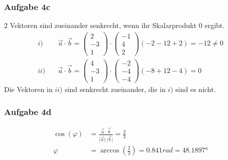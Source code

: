 \documentclass[a4paper,11pt]{article}
\begin{document}
  \subsubsection*{Aufgabe 4c}
    2 Vektoren sind zueinander senkrecht, wenn ihr Skalarprodukt 0 ergibt.
    \begin{align*}
      i) \quad&\vec{a}\cdot\vec{b}=\begin{pmatrix}2\\-3\\1\end{pmatrix}\cdot\begin{pmatrix}-1\\4\\2\end{pmatrix}(-2-12+2)=-12\neq0 \\
      ii) \quad&\vec{a}\cdot\vec{b}=\begin{pmatrix}4\\-3\\1\end{pmatrix}\cdot\begin{pmatrix}-2\\-4\\-4\end{pmatrix}(-8+12-4)=0
    \end{align*}
    Die Vektoren in $ii)$ sind senkrecht zueinander, die in $i)$ sind es nicht.
  \subsubsection*{Aufgabe 4d}
    \begin{align*}
      \cos(\varphi)&=\frac{\vec{a}\cdot\vec{b}}{\vert\vec{a}\vert\cdot\vert\vec{b}\vert}=\frac{2}{3} \\
      \varphi &= \arccos\left(\frac{2}{3}\right)=0.841rad=\ang{48.1897}
    \end{align*}
  
\end{document}
